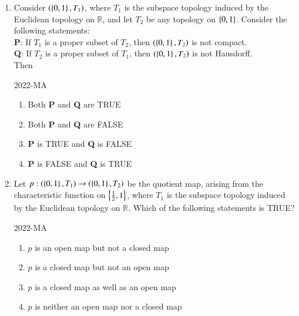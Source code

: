 \documentclass[journal,12pt,onecolumn]{IEEEtran}
\theoremstyle{remark}
\begin{document}
\begin{enumerate}
\item Consider $\left(\left\{0,1\right\}, T_1\right)$, where $T_1$ is the subspace topology induced by the Euclidean topology on $\mathbb{R}$, and let $T_2$ be any topology on $\left\{0,1\right\}$. Consider the following statements: \\
	\textbf{P}: If $T_1$ is a proper subset of $T_2$, then $\left(\left\{0,1\right\}, T_2\right)$ is not compact. \\
	\textbf{Q}: If $T_2$ is a proper subset of $T_1$, then $\left(\left\{0,1\right\}, T_2\right)$ is not Hausdorff. \\
	Then
	
	\hfill{2022-MA}

	\begin{enumerate}
		\item Both \textbf{P} and \textbf{Q} are TRUE
		\item Both \textbf{P} and \textbf{Q} are FALSE
		\item \textbf{P} is TRUE and \textbf{Q} is FALSE
		\item \textbf{P} is FALSE and \textbf{Q} is TRUE
	\end{enumerate}

\item Let $p:\left(\left\{0,1\right\}, T_1\right) \to \left(\left\{0,1\right\}, T_2\right)$ be the quotient map, arising from the characteristic function on $\left\{ \frac{1}{2}, 1\right\}$, where $T_1$ is the subspace topology induced by the Euclidean topology on $\mathbb{R}$. Which of the following statements is TRUE?
	
	\hfill{2022-MA}

	\begin{enumerate}
		\item $p$ is an open map but not a closed map
		\item $p$ is a closed map but not an open map
		\item $p$ is a closed map as well as an open map
		\item $p$ is neither an open map nor a closed map
	\end{enumerate}



\end{enumerate}
\end{document}
